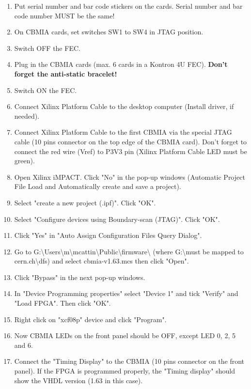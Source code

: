 \documentclass[11pt,a4paper]{article}
\begin{document}
\begin{enumerate}
	\item Put serial number and bar code stickers on the cards.
				\newline Serial number and bar code number MUST be the same!
	\item On CBMIA cards, set switches SW1 to SW4 in JTAG position.
	\item Switch OFF the FEC.
	\item Plug in the CBMIA cards (max. 6 cards in a Kontron 4U FEC). 
				\newline \textbf{Don't forget the anti-static bracelet!}
	\item Switch ON the FEC.
	\item Connect Xilinx Platform Cable to the desktop computer (Install driver, if needed).
	\item Connect Xilinx Platform Cable to the first CBMIA via the special JTAG cable (10 pins connector on the top edge of the CBMIA card). Don't forget to connect the red wire (Vref) to P3V3 pin (Xilinx Platform Cable LED must be green).
	\item Open Xilinx iMPACT. Click "No" in the pop-up windows (Automatic Project File Load and Automatically create and save a project).
	\item Select "create a new project (.ipf)". Click "OK".
	\item Select "Configure devices using Boundary-scan (JTAG)". Click "OK".
	\item Click "Yes" in "Auto Assign Configuration Files Query Dialog".
	\item Go to G:\textbackslash Users\textbackslash m\textbackslash mcattin\textbackslash Public\textbackslash firmware\textbackslash 
				\newline (where G:\textbackslash must be mapped to cern.ch\textbackslash dfs) and select cbmia-v1.63.mcs then click "Open".
	\item Click "Bypass" in the next pop-up windows.
	\item In "Device Programming properties" select "Device 1" and tick "Verify" and "Load FPGA". Then click "OK".
	\item Right click on "xcf08p" device and click "Program".
	\item Now CBMIA LEDs on the front panel should be OFF, except LED 0, 2, 5 and 6.
	\item Connect the "Timing Display" to the CBMIA (10 pins connector on the front panel). If the FPGA is programmed properly, the "Timing display" should show the VHDL version (1.63 in this case).

\end{enumerate}
\end{document}
